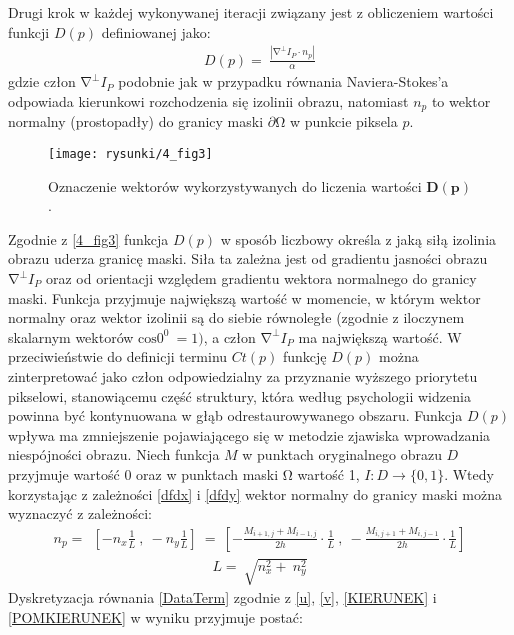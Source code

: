 \documentclass[12pt, twoside, openany]{report}
\theoremstyle{definition}
\begin{document}
Drugi krok w każdej wykonywanej iteracji związany jest z obliczeniem wartości funkcji $D(p)$ definiowanej jako:
\begin{align}
D(p)=\ \frac{\left|{\mathrm{\nabla }}^{\bot }I_P\cdot n_p\right|}{\alpha }
\label{DataTerm}
\end{align}
gdzie człon ${\mathrm{\nabla }}^{\bot }I_P$ podobnie jak w przypadku równania Naviera-Stokes'a odpowiada kierunkowi rozchodzenia się izolinii obrazu, natomiast  $n_p$ to wektor normalny (prostopadły) do granicy maski $\partial \mathrm{\Omega }$ w punkcie piksela $p$.  
\begin{figure}[!h]
	\centering
	\texttt{[image: rysunki/4\_fig3]}
	\caption{Oznaczenie wektorów wykorzystywanych do liczenia wartości $\boldsymbol{D}\left(\boldsymbol{p}\right)$.}
	\label{4_fig3} 
\end{figure}
Zgodnie z \autoref{4_fig3} funkcja $D\left(p\right)$ w sposób liczbowy określa z jaką siłą izolinia obrazu uderza granicę maski. Siła ta zależna jest od gradientu jasności obrazu ${\mathrm{\nabla }}^{\bot }I_P$ oraz od orientacji względem gradientu wektora normalnego do granicy maski. Funkcja przyjmuje największą wartość w momencie, w którym wektor normalny oraz wektor izolinii są do siebie równoległe (zgodnie z iloczynem skalarnym wektorów ${\mathrm{cos} 0^0\ }=1)$, a człon ${\mathrm{\nabla }}^{\bot }I_P$ ma największą wartość. W przeciwieństwie do definicji terminu $Ct(p)$ funkcję $D(p)$ można zinterpretować jako człon odpowiedzialny za przyznanie wyższego priorytetu pikselowi, stanowiącemu część struktury, która według psychologii widzenia powinna być kontynuowana w głąb odrestaurowywanego obszaru. Funkcja $D(p)$ wpływa ma zmniejszenie pojawiającego się w metodzie zjawiska wprowadzania niespójności obrazu. Niech funkcja $M$ w punktach oryginalnego obrazu $D$ przyjmuje wartość 0 oraz w punktach maski $\mathrm{\Omega }$ wartość 1, $I:D\to \{0,1\}$.  Wtedy korzystając z zależności \eqref{dfdx} i \eqref{dfdy} wektor normalny do granicy maski można wyznaczyć z zależności:
\begin{align}
n_p=\ \ \left[-n_x\frac{1}{L}\ ,\ -n_y\frac{1}{L}\right]\ =\ \left[-\frac{M_{i+1,j}+M_{i-1,j}}{2h}\cdot \frac{1}{L}\ ,\ -\frac{M_{i,j+1}+M_{i,j-1}}{2h}\cdot \frac{1}{L}\right]
\label{KIERUNEK}
\end{align}
\begin{align}
L=\ \sqrt{n^2_x+\ n^2_y}
\label{POMKIERUNEK}
\end{align}
Dyskretyzacja równania \eqref{DataTerm} zgodnie z \eqref{u}, \eqref{v}, \eqref{KIERUNEK} i \eqref{POMKIERUNEK} w wyniku przyjmuje postać:
\end{document}
